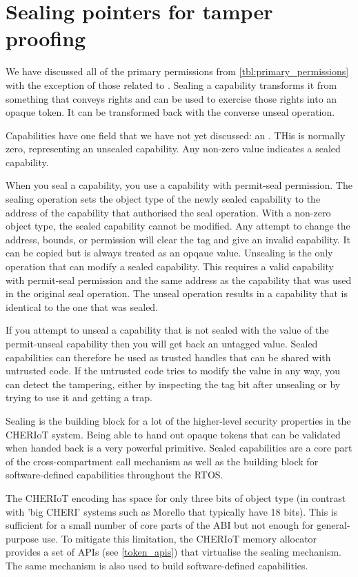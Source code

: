 \section[label=sealing_intro]{Sealing pointers for tamper proofing}

We have discussed all of the primary permissions from \ref{tbl:primary_permissions} with the exception of those related to .
Sealing a capability transforms it from something that conveys rights and can be used to exercise those rights into an opaque token.
It can be transformed back with the converse unseal operation.

Capabilities have one field that we have not yet discussed: an .
THis is normally zero, representing an unsealed capability.
Any non-zero value indicates a sealed capability.

When you seal a capability, you use a capability with permit-seal permission.
The sealing operation sets the object type of the newly sealed capability to the address of the capability that authorised the seal operation.
With a non-zero object type, the sealed capability cannot be modified.
Any attempt to change the address, bounds, or permission will clear the tag and give an invalid capability.
It can be copied but is always treated as an opqaue value.
Unsealing is the only operation that can modify a sealed capability.
This requires a valid capability with permit-seal permission and the same address as the capability that was used in the original seal operation.
The unseal operation results in a capability that is identical to the one that was sealed.

If you attempt to unseal a capability that is not sealed with the value of the permit-unseal capability then you will get back an untagged value.
Sealed capabilities can therefore be used as trusted handles that can be shared with untrusted code.
If the untrusted code tries to modify the value in any way, you can detect the tampering, either by inspecting the tag bit after unsealing or by trying to use it and getting a trap.

Sealing is the building block for a lot of the higher-level security properties in the CHERIoT system.
Being able to hand out opaque tokens that can be validated when handed back is a very powerful primitive.
Sealed capabilities are a core part of the cross-compartment call mechanism as well as the building block for software-defined capabilities throughout the RTOS.

The CHERIoT encoding has space for only three bits of object type (in contrast with 'big CHERI' systems such as Morello that typically have 18 bits).
This is sufficient for a small number of core parts of the ABI but not enough for general-purpose use.
To mitigate this limitation, the CHERIoT memory allocator provides a set of APIs (see \ref{token_apis}) that virtualise the sealing mechanism.
The same mechanism is also used to build software-defined capabilities.

